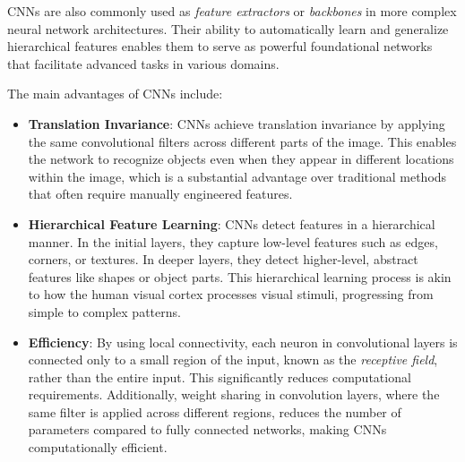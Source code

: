 CNNs are also commonly used as \textit{feature extractors} or \textit{backbones} in more complex neural network architectures. Their ability to automatically learn and generalize hierarchical features enables them to serve as powerful foundational networks that facilitate advanced tasks in various domains.

The main advantages of CNNs include:
\begin{itemize}
    \item \textbf{Translation Invariance}: CNNs achieve translation invariance by applying the same convolutional filters across different parts of the image. This enables the network to recognize objects even when they appear in different locations within the image, which is a substantial advantage over traditional methods that often require manually engineered features.

    \item \textbf{Hierarchical Feature Learning}: CNNs detect features in a hierarchical manner. In the initial layers, they capture low-level features such as edges, corners, or textures. In deeper layers, they detect higher-level, abstract features like shapes or object parts. This hierarchical learning process is akin to how the human visual cortex processes visual stimuli, progressing from simple to complex patterns.

    \item \textbf{Efficiency}: By using local connectivity, each neuron in convolutional layers is connected only to a small region of the input, known as the \textit{receptive field}, rather than the entire input. This significantly reduces computational requirements. Additionally, weight sharing in convolution layers, where the same filter is applied across different regions, reduces the number of parameters compared to fully connected networks, making CNNs computationally efficient.
\end{itemize}


